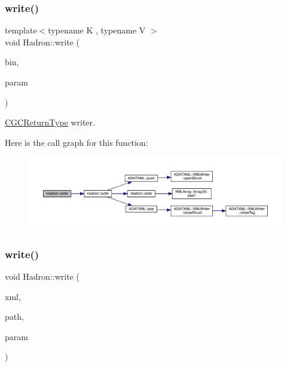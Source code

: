 \subsubsection{\texorpdfstring{write()}{write()}\hspace{0.1cm}{\footnotesize\ttfamily [21/95]}}
{\footnotesize\ttfamily template$<$typename K , typename V $>$ \\
void Hadron\+::write (\begin{DoxyParamCaption}\item[{\mbox{\hyperlink{classADATIO_1_1BinaryWriter}{Binary\+Writer}} \&}]{bin,  }\item[{const \mbox{\hyperlink{structHadron_1_1CGCReturnType}{C\+G\+C\+Return\+Type}}$<$ K, V $>$ \&}]{param }\end{DoxyParamCaption})\hspace{0.3cm}{\ttfamily [inline]}}



\mbox{\hyperlink{structHadron_1_1CGCReturnType}{C\+G\+C\+Return\+Type}} writer. 

Here is the call graph for this function\+:
\nopagebreak
\begin{figure}[H]
\begin{center}
\leavevmode
\includegraphics[width=350pt]{d1/daf/namespaceHadron_a67e12d192d662851e588e9f3504ec45e_cgraph}
\end{center}
\end{figure}
\mbox{\label{namespaceHadron_ad432e121844a2fa83775051e43481116}} 
\subsubsection{\texorpdfstring{write()}{write()}\hspace{0.1cm}{\footnotesize\ttfamily [22/95]}}
{\footnotesize\ttfamily void Hadron\+::write (\begin{DoxyParamCaption}\item[{\mbox{\hyperlink{classADATXML_1_1XMLWriter}{X\+M\+L\+Writer}} \&}]{xml,  }\item[{const std\+::string \&}]{path,  }\item[{const \mbox{\hyperlink{structHadron_1_1KeyMesonElementalOperator__t}{Key\+Meson\+Elemental\+Operator\+\_\+t}} \&}]{param }\end{DoxyParamCaption})}



